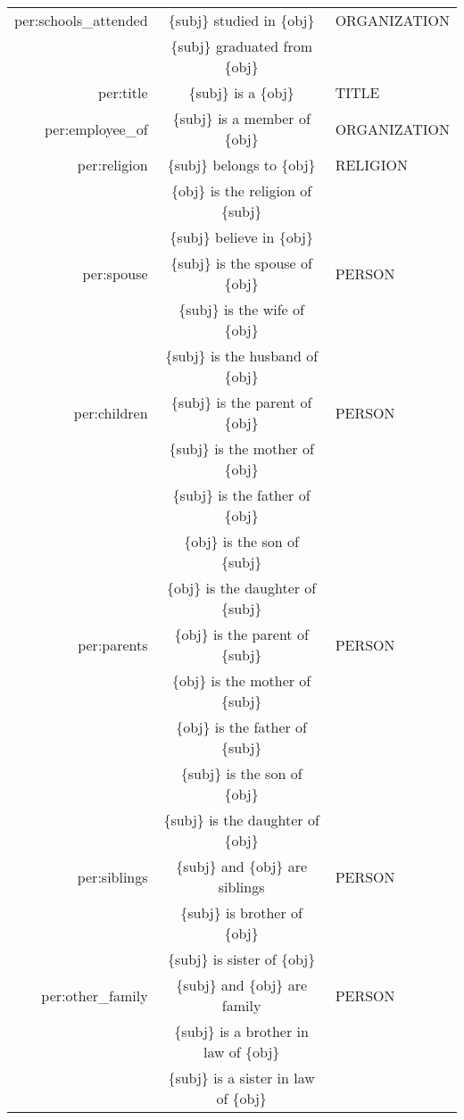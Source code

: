 \documentclass[11pt]{article}
\begin{document}
\begin{table*}[t]
{\begin{tabular}{rcl}
            per:schools\_attended & \{subj\} studied in \{obj\} & ORGANIZATION \\
             & \{subj\} graduated from \{obj\} & \\
            per:title & \{subj\} is a \{obj\} & TITLE \\
            per:employee\_of & \{subj\} is a member of \{obj\} & ORGANIZATION \\
            per:religion & \{subj\} belongs to \{obj\} & RELIGION \\
             & \{obj\} is the religion of \{subj\} & \\
             & \{subj\} believe in \{obj\} & \\
            per:spouse & \{subj\} is the spouse of \{obj\} & PERSON \\
             & \{subj\} is the wife of \{obj\} & \\
             & \{subj\} is the husband of \{obj\} & \\
            per:children & \{subj\} is the parent of \{obj\} & PERSON \\
             & \{subj\} is the mother of \{obj\} & \\
             & \{subj\} is the father of \{obj\} & \\
             & \{obj\} is the son of \{subj\} & \\
             & \{obj\} is the daughter of \{subj\} & \\
            per:parents & \{obj\} is the parent of \{subj\} & PERSON \\
             & \{obj\} is the mother of \{subj\} & \\
             & \{obj\} is the father of \{subj\} & \\
             & \{subj\} is the son of \{obj\} & \\
             & \{subj\} is the daughter of \{obj\} & \\
            per:siblings & \{subj\} and \{obj\} are siblings & PERSON \\
             & \{subj\} is brother of \{obj\} & \\
             & \{subj\} is sister of \{obj\} & \\
            per:other\_family & \{subj\} and \{obj\} are family & PERSON \\
             & \{subj\} is a brother in law of \{obj\} & \\
             & \{subj\} is a sister in law of \{obj\} & \\

\end{tabular}}
\end{table*}
\end{document}
